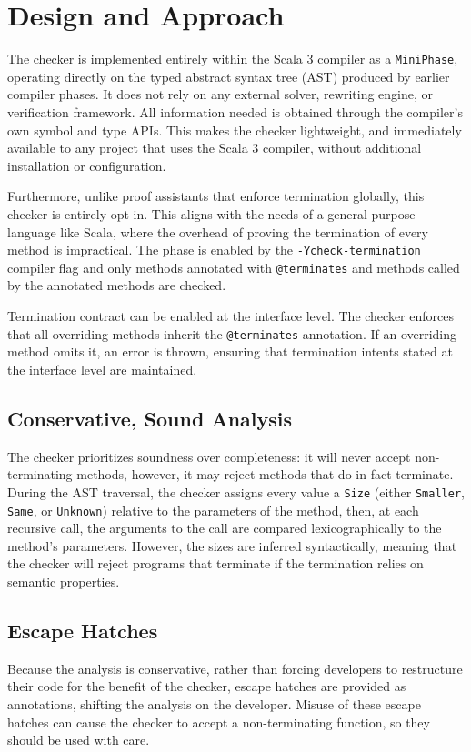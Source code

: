 \chapter{Design and Approach}

The checker is implemented entirely within the Scala 3 compiler as a
\texttt{MiniPhase}, operating directly on the typed abstract syntax tree (AST)
produced by earlier compiler phases. It does not rely on any external solver,
rewriting engine, or verification framework. All information needed is obtained
through the compiler's own symbol and type APIs. This makes the checker
lightweight, and immediately available to any project that uses the Scala 3
compiler, without additional installation or configuration.

Furthermore, unlike proof assistants that enforce termination globally, this
checker is entirely opt-in. This aligns with the needs of a general-purpose
language like Scala, where the overhead of proving the termination of every
method is impractical.
The phase is enabled by the \texttt{-Ycheck-termination} compiler flag and only
methods annotated with \texttt{@terminates} and methods called by the annotated
methods are checked.

Termination contract can be enabled at the interface level. The checker enforces
that all overriding methods inherit the \texttt{@terminates} annotation. If an
overriding method omits it, an error is thrown, ensuring that termination
intents stated at the interface level are maintained.

\section{Conservative, Sound Analysis}
The checker prioritizes soundness over completeness: it will never accept
non-terminating methods, however, it may reject methods that do in fact
terminate.
During the AST traversal, the checker assigns every value a \texttt{Size}
(either \texttt{Smaller}, \texttt{Same}, or \texttt{Unknown}) relative to the
parameters of the method, then, at each recursive call, the arguments to the
call are compared lexicographically to the method's parameters. However, the
sizes are inferred syntactically, meaning that the checker will reject programs
that terminate if the termination relies on semantic properties.

\section{Escape Hatches}
Because the analysis is conservative, rather than forcing developers to
restructure their code for the benefit of the checker, escape hatches are
provided as annotations, shifting the analysis on the developer. Misuse of these
escape hatches can cause the checker to accept a non-terminating function, so
they should be used with care.

